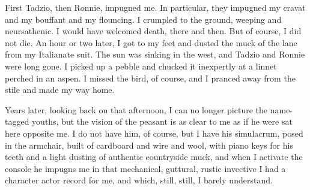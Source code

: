 First Tadzio, then Ronnie, impugned me. In particular, they impugned my cravat and my bouffant and my flouncing. I crumpled to the ground, weeping and neursathenic. I would have welcomed death, there and then. But of course, I did not die. An hour or two later, I got to my feet and dusted the muck of the lane from my Italianate suit. The sun was sinking in the west, and Tadzio and Ronnie were long gone. I picked up a pebble and chucked it inexpertly at a linnet perched in an aspen. I missed the bird, of course, and I pranced away from the stile and made my way home.

Years later, looking back on that afternoon, I can no longer picture the name-tagged youths, but the vision of the peasant is as clear to me as if he were sat here opposite me. I do not have him, of course, but I have his simulacrum, posed in the armchair, built of cardboard and wire and wool, with piano keys for his teeth and a light dusting of authentic countryside muck, and when I activate the console he impugns me in that mechanical, guttural, rustic invective I had a character actor record for me, and which, still, still, I barely understand.
